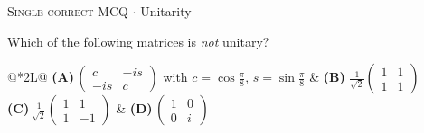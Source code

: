 \documentclass[11pt,a4paper]{article}
\newcommand{\optlabel}[1]{\textbf{(#1)}}
\newcommand{\correctlabel}[1]{\textcolor{okgreen}{\textbf{(#1)}\,\ding{51}}}
\newenvironment{qitem}[1]{\begin{list}{}{\setlength{\leftmargin}{3.3em}\setlength{\labelwidth}{3.1em}%
  \setlength{\labelsep}{0.2em}\setlength{\topsep}{3pt}\setlength{\parsep}{3pt}}\item[\textbf{Q.#1}\hfill]}{\end{list}}
\newcommand{\qmeta}[2]{{\footnotesize\color{black!60}\textsc{#1} \;$\cdot$\; #2}\par}
\begin{document}
\begin{qitem}{29}
\qmeta{Single-correct MCQ}{Unitarity}
Which of the following matrices is \emph{not} unitary?
\par\smallskip\noindent\begin{tabularx}{\linewidth}{@{}*{2}{L}@{}}
\optlabel{A}\,$\begin{pmatrix}c & -is\\ -is & c\end{pmatrix}$ with $c = \cos\frac\pi8$, $s = \sin\frac\pi8$ & \correctlabel{B}\,$\frac{1}{\sqrt2}\begin{pmatrix}1 & 1\\ 1 & 1\end{pmatrix}$ \\[3pt]
\optlabel{C}\,$\frac{1}{\sqrt2}\begin{pmatrix}1 & 1\\ 1 & -1\end{pmatrix}$ & \optlabel{D}\,$\begin{pmatrix}1 & 0\\ 0 & i\end{pmatrix}$
\end{tabularx}
\end{qitem}
\end{document}
